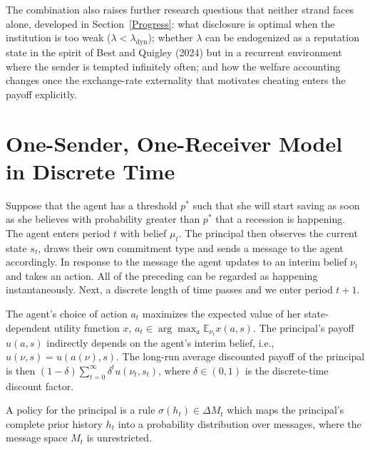 \documentclass[12pt]{article}
\begin{document}
The combination also raises further research questions that neither strand faces alone, developed in Section~\ref{Progress}: what disclosure is optimal when the institution is too weak ($\lambda<\lambda_{\mathrm{dyn}}$); whether $\lambda$ can be endogenized as a reputation state in the spirit of Best and Quigley (2024) but in a recurrent environment where the sender is tempted infinitely often; and how the welfare accounting changes once the exchange-rate externality that motivates cheating enters the payoff explicitly.

\section{One-Sender, One-Receiver Model in Discrete Time}\label{Model}

Suppose that the agent has a threshold $p^*$ such that she will start saving as soon as she believes with probability greater than $p^*$ that a recession is happening. The agent enters period $t$ with belief $\mu_t$. The principal then observes the current state $s_t$, draws their own commitment type and sends a message to the agent accordingly. In response to the message the agent updates to an interim belief $\nu_t$ and takes an action. All of the preceding can be regarded as happening instantaneously. Next, a discrete length of time passes and we enter period $t+1$.

The agent's choice of action $a_t$ maximizes the expected value of her state-dependent utility function $x$, $a_t \in \arg\max_a \mathbb{E}_{\nu_t} x(a,s)$. The principal's payoff $u(a,s)$ indirectly depends on the agent's interim belief, i.e., $u(\nu,s) = u(a(\nu),s)$. The long-run average discounted payoff of the principal is then $(1-\delta)\sum_{t=0}^{\infty}\delta^t u(\nu_t, s_t)$, where $\delta \in (0,1)$ is the discrete-time discount factor.

A policy for the principal is a rule $\sigma(h_t) \in \Delta M_t$ which maps the principal's complete prior history $h_t$ into a probability distribution over messages, where the message space $M_t$ is unrestricted.
\end{document}
